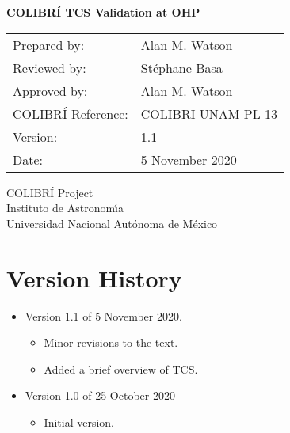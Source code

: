\documentclass{article}
\begin{document}
\pagestyle{empty}

\begin{center}

{\Large \bfseries COLIBRÍ TCS Validation at OHP}

\vspace{2cm}

\begin{tabular}{ll}
Prepared by:&Alan M. Watson\\
Reviewed by:&Stéphane Basa\\
Approved by:&Alan M. Watson\\
COLIBRÍ Reference:&COLIBRI-UNAM-PL-13\\
Version:&1.1\\
Date:&5 November 2020\\
\end{tabular}

\vspace{\fill}

COLIBRÍ Project\\
Instituto de Astronom{\'\i}a\\
Universidad Nacional Aut\'onoma de M\'exico

\end{center}

\newpage

\clearpage
\section*{Version History}

\begin{itemize}
\item Version 1.1 of 5 November 2020.

\begin{itemize}
    \item Minor revisions to the text.
    \item Added a brief overview of TCS.
\end{itemize}

\item Version 1.0 of 25 October 2020

\begin{itemize}
    \item Initial version.
\end{itemize}

\end{itemize}

\end{document}
